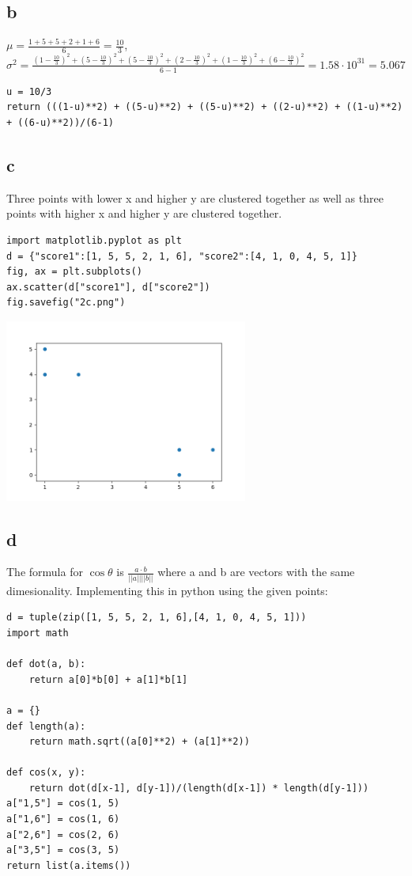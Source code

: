 \documentclass[11pt]{article}
\begin{document}
\subsection{b}
\label{sec:org1979d5c}
\(\mu = \frac{1+5+5+2+1+6}{6} = \frac{10}{3}\), \(\sigma^2 =
   \frac{(1-\frac{10}{3})^2+(5-\frac{10}{3})^2+(5-\frac{10}{3})^2+(2-\frac{10}{3})^2+(1-\frac{10}{3})^2+(6-\frac{10}{3})^2}{6-1}
   = 1.58 \cdot 10^{31} = 5.067\)
\begin{verbatim}
u = 10/3
return (((1-u)**2) + ((5-u)**2) + ((5-u)**2) + ((2-u)**2) + ((1-u)**2) + ((6-u)**2))/(6-1)
\end{verbatim}


\subsection{c}
\label{sec:org8ef546e}
Three points with lower x and higher y are clustered together as well as three
points with higher x and higher y are clustered together.
\begin{verbatim}
import matplotlib.pyplot as plt
d = {"score1":[1, 5, 5, 2, 1, 6], "score2":[4, 1, 0, 4, 5, 1]}
fig, ax = plt.subplots()
ax.scatter(d["score1"], d["score2"])
fig.savefig("2c.png")
\end{verbatim}

\begin{center}
\includegraphics[width=8cm]{2c.png}
\end{center}
\subsection{d}
\label{sec:org18b72e8}
The formula for \(\cos \theta\) is \(\frac{a \cdot b}{||a||||b||}\) where a and b are
vectors with the same dimesionality. Implementing this in python using the given points:
\begin{verbatim}
d = tuple(zip([1, 5, 5, 2, 1, 6],[4, 1, 0, 4, 5, 1]))
import math

def dot(a, b):
    return a[0]*b[0] + a[1]*b[1]

a = {}
def length(a):
    return math.sqrt((a[0]**2) + (a[1]**2))

def cos(x, y):
    return dot(d[x-1], d[y-1])/(length(d[x-1]) * length(d[y-1]))
a["1,5"] = cos(1, 5)
a["1,6"] = cos(1, 6)
a["2,6"] = cos(2, 6)
a["3,5"] = cos(3, 5)
return list(a.items())

\end{verbatim}
\end{document}
